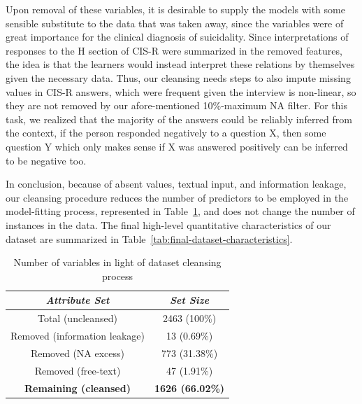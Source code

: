 Upon removal of these variables, it is desirable to supply the models with some sensible substitute to the data that was taken away, since the variables were of great importance for the clinical diagnosis of suicidality.
Since interpretations of responses to the H section of CIS-R were summarized in the removed features, the idea is that the learners would instead interpret these relations by themselves given the necessary data.
Thus, our cleansing needs steps to also impute missing values in CIS-R answers, which were frequent given the interview is non-linear, so they are not removed by our afore-mentioned 10\%-maximum NA filter.
For this task, we realized that the majority of the answers could be reliably inferred from the context, if the person responded negatively to a question X, then some question Y which only makes sense if X was answered positively can be inferred to be negative too.

In conclusion, because of absent values, textual input, and information leakage, our cleansing procedure reduces the number of predictors to be employed in the model-fitting process, represented in Table~\ref{tab:dataset-cleansing}, and does not change the number of instances in the data.
The final high-level quantitative characteristics of our dataset are summarized in Table~\ref{tab:final-dataset-characteristics}.

\begin{table}[h]
    \caption{Number of variables in light of dataset cleansing process}
    \begin{center}
        \begin{tabular}{c|c}
            \textit{Attribute Set}        & \textit{Set Size}       \\
            \hline
            \hline
            Total (uncleansed)            & 2463 (100\%)            \\
            Removed (information leakage) & 13 (0.69\%)             \\
            Removed (NA excess)           & 773 (31.38\%)           \\
            Removed (free-text)           & 47 (1.91\%)             \\
            \textbf{Remaining (cleansed)} & \textbf{1626 (66.02\%)} \\
            \hline
        \end{tabular}
    \end{center}
    \label{tab:dataset-cleansing}
\end{table}

